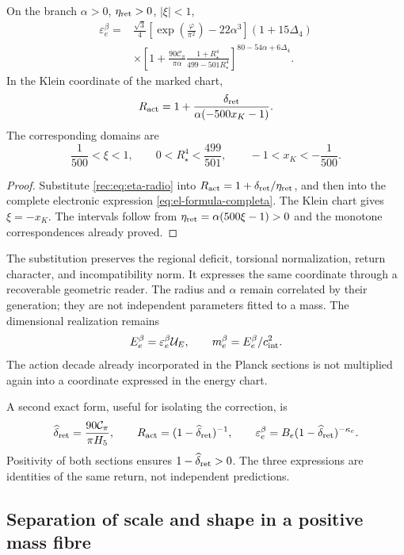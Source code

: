 \begin{corollary}
\label{rec:cor:electron}
On the branch \(\alpha>0\), \(\eta_{\rm ret}>0\), \(|\xi|<1\),
\begin{align}
 \varepsilon_e^{\beta}={}&
 \frac{\sqrt3}{4}
 \left[\exp\!\left(\frac\varphi{\pi^2}\right)-22\alpha^3\right]
 (1+15\Delta_4)\nonumber\\
 &\times\left[1+\frac{90\mathcal C_\pi}{\pi\alpha}
 \frac{1+R_\star^4}{499-501R_\star^4}\right]^{80-54\alpha+6\Delta_4}.
 \label{rec:eq:electron-radio}
\end{align}
In the Klein coordinate of the marked chart,
\begin{equation}
 R_{\rm act}=1+
 \frac{\delta_{\rm ret}}{\alpha(-500x_K-1)}.
 \label{rec:eq:accion-klein}
\end{equation}
The corresponding domains are
\[
 \frac1{500}<\xi<1,\qquad
 0<R_\star^4<\frac{499}{501},\qquad
 -1<x_K<-\frac1{500}.
\]
\end{corollary}
\begin{proof}
Substitute \eqref{rec:eq:eta-radio} into \(R_{\rm act}=1+\delta_{\rm ret}/\eta_{\rm ret}\), and then into the complete electronic expression \eqref{eq:el-formula-completa}. The Klein chart gives \(\xi=-x_K\). The intervals follow from \(\eta_{\rm ret}=\alpha(500\xi-1)>0\) and the monotone correspondences already proved.
\end{proof}

The substitution preserves the regional deficit, torsional normalization, return character, and incompatibility norm. It expresses the same coordinate through a recoverable geometric reader. The radius and \(\alpha\) remain correlated by their generation; they are not independent parameters fitted to a mass. The dimensional realization remains
\[
 E_e^{\beta}=\varepsilon_e^{\beta}\mathcal U_E,\qquad
 m_e^{\beta}=E_e^{\beta}/c_{\rm int}^2.
\]
The action decade already incorporated in the Planck sections is not multiplied again into a coordinate expressed in the energy chart.

A second exact form, useful for isolating the correction, is
\[
 \widehat\delta_{\rm ret}=\frac{90\mathcal C_\pi}{\pi H_5},\qquad
 R_{\rm act}=(1-\widehat\delta_{\rm ret})^{-1},\qquad
 \varepsilon_e^{\beta}=B_e(1-\widehat\delta_{\rm ret})^{-\kappa_e}.
\]
Positivity of both sections ensures \(1-\widehat\delta_{\rm ret}>0\). The three expressions are identities of the same return, not independent predictions.

\subsection{Separation of scale and shape in a positive mass fibre}

